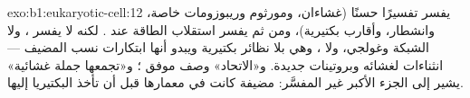 \begin{solution}{exo:b1:eukaryotic-cell:12}
 يفسر   تفسيرًا حسنًا (غشاءان،
ومورثوم وريبوزومات خاصة، وانشطار، وأقارب بكتيرية)، ومن ثم يفسر
استقلاب الطاقة عند . لكنه لا يفسر ، ولا الشبكة
وغولجي، ولا ، وهي بلا نظائر بكتيرية ويبدو أنها ابتكارات
نسب المضيف --- انثناءات لغشائه وبروتينات جديدة. و«الاتحاد» وصف
موفق ؛ و«تجمعها جملة غشائية» يشير إلى الجزء الأكبر غير
المفسَّر:  مضيفة كانت  في معمارها قبل أن تأخذ
البكتيريا إليها.
\end{solution}

